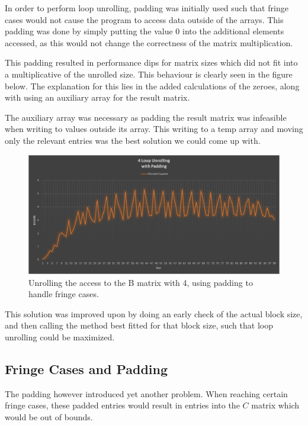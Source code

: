 \documentclass[a4paper,11pt,oneside]{book}
\begin{document}


In order to perform loop unrolling, padding was initially used such that fringe
cases would not cause the program to access data outside of the arrays. This
padding was done by simply putting the value 0 into the additional elements
accessed, as this would not change the correctness of the matrix multiplication.

This padding resulted in performance dips for matrix sizes which did not fit
into a multiplicative of the unrolled size. This behaviour is clearly seen in
the figure below. The explanation for this lies in the added calculations of the
zeroes, along with using an auxiliary array for the result matrix.

The auxiliary array was necessary as padding the result matrix was infeasible
when writing to values outside its array. This writing to a temp array and
moving only the relevant entries was the best solution we could come up with.

\begin{figure}
  \centering
  \includegraphics[width=0.9\linewidth]{graph-blocked-padding.png}
  \caption{Unrolling the access to the B matrix with 4, using padding to handle 
           fringe cases.}
  \centering
  \label{fig:sub1}
\end{figure}

This solution was improved upon by doing an early check of the actual block
size, and then calling the method best fitted for that block size, such that
loop unrolling could be maximized.

\subsection{Fringe Cases and Padding}

The padding however introduced yet another problem. When reaching certain fringe
cases, these padded entries would result in entries into the $C$ matrix which
would be out of bounds.
\end{document}
